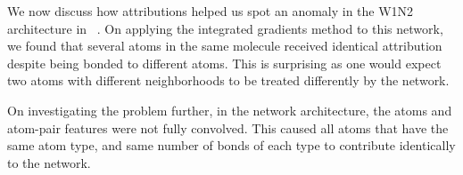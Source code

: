 We now discuss how attributions helped us spot an anomaly in the W1N2
architecture in ~\cite{KMBPR16}. On applying the integrated gradients
method to this network, we found that several atoms in the same
molecule received identical attribution despite being bonded to
different atoms. This is surprising as one would expect two atoms with
different neighborhoods to be treated differently by the network.

On investigating the problem further, in the network architecture,
the atoms and atom-pair features were not fully convolved. This
caused all atoms that have the
same atom type, and same number of bonds of each type to contribute
identically to the network.





